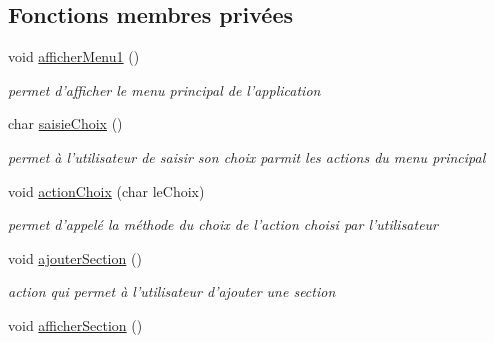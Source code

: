 \subsection*{Fonctions membres privées}
\begin{DoxyCompactItemize}
\item 
\hypertarget{class_application_adfcba0e50f0c263cdde8017329baaf37}{void \hyperlink{class_application_adfcba0e50f0c263cdde8017329baaf37}{afficher\+Menu1} ()}\label{class_application_adfcba0e50f0c263cdde8017329baaf37}

\begin{DoxyCompactList}\small\item\em permet d'afficher le menu principal de l'application \end{DoxyCompactList}\item 
\hypertarget{class_application_a019c961894cce7c789070053083b4c3f}{char \hyperlink{class_application_a019c961894cce7c789070053083b4c3f}{saisie\+Choix} ()}\label{class_application_a019c961894cce7c789070053083b4c3f}

\begin{DoxyCompactList}\small\item\em permet à l'utilisateur de saisir son choix parmit les actions du menu principal \end{DoxyCompactList}\item 
\hypertarget{class_application_a0d957c3dd1a2d88b2c9d5c01bd123a9d}{void \hyperlink{class_application_a0d957c3dd1a2d88b2c9d5c01bd123a9d}{action\+Choix} (char le\+Choix)}\label{class_application_a0d957c3dd1a2d88b2c9d5c01bd123a9d}

\begin{DoxyCompactList}\small\item\em permet d'appelé la méthode du choix de l'action choisi par l'utilisateur \end{DoxyCompactList}\item 
\hypertarget{class_application_a08280a27faf4c8dcae825cc2bf87845d}{void \hyperlink{class_application_a08280a27faf4c8dcae825cc2bf87845d}{ajouter\+Section} ()}\label{class_application_a08280a27faf4c8dcae825cc2bf87845d}

\begin{DoxyCompactList}\small\item\em action qui permet à l'utilisateur d'ajouter une section \end{DoxyCompactList}\item 
\hypertarget{class_application_a0096f4706fc9c1ede19b3c7a91673898}{void \hyperlink{class_application_a0096f4706fc9c1ede19b3c7a91673898}{afficher\+Section} ()}\label{class_application_a0096f4706fc9c1ede19b3c7a91673898}


\end{DoxyCompactItemize}
